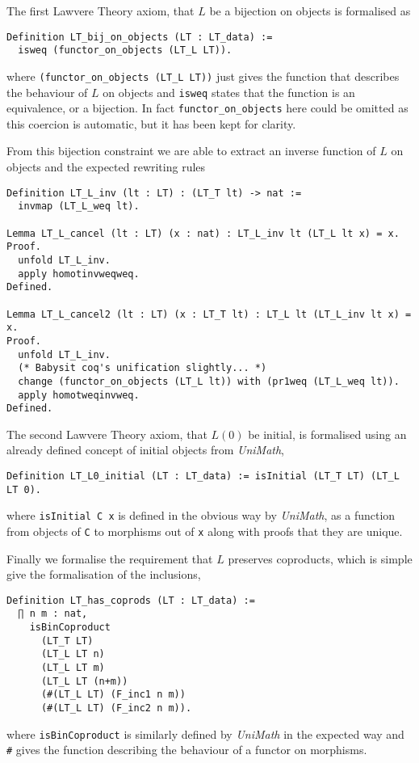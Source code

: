 The first Lawvere Theory axiom, that $L$ be a bijection on objects is formalised
as
\begin{lstlisting}
Definition LT_bij_on_objects (LT : LT_data) := 
  isweq (functor_on_objects (LT_L LT)).
\end{lstlisting}
where \lstinline|(functor_on_objects (LT_L LT))| just gives the function that
describes the behaviour of $L$ on objects and \lstinline|isweq| states that the
function is an equivalence, or a bijection. In fact \lstinline|functor_on_objects|
here could be omitted as this coercion is automatic, but it has been kept for
clarity.

From this bijection constraint we are able to extract an inverse function of $L$
on objects and the expected rewriting rules
\begin{lstlisting}
Definition LT_L_inv (lt : LT) : (LT_T lt) -> nat :=
  invmap (LT_L_weq lt).

Lemma LT_L_cancel (lt : LT) (x : nat) : LT_L_inv lt (LT_L lt x) = x.
Proof.
  unfold LT_L_inv.
  apply homotinvweqweq.
Defined.
  
Lemma LT_L_cancel2 (lt : LT) (x : LT_T lt) : LT_L lt (LT_L_inv lt x) = x.
Proof.
  unfold LT_L_inv.
  (* Babysit coq's unification slightly... *)
  change (functor_on_objects (LT_L lt)) with (pr1weq (LT_L_weq lt)).
  apply homotweqinvweq.
Defined.
\end{lstlisting}

The second Lawvere Theory axiom, that $L(0)$ be initial, is formalised using an
already defined concept of initial objects from \textit{UniMath},
\begin{lstlisting}
Definition LT_L0_initial (LT : LT_data) := isInitial (LT_T LT) (LT_L LT 0).
\end{lstlisting}
where \lstinline|isInitial C x| is defined in the obvious way by \textit{UniMath}, as
a function from objects of \lstinline|C| to morphisms out of \lstinline|x| along with
proofs that they are unique.

Finally we formalise the requirement that $L$ preserves coproducts, which is
simple give the formalisation of the inclusions,
\begin{lstlisting}
Definition LT_has_coprods (LT : LT_data) := 
  ∏ n m : nat, 
    isBinCoproduct 
      (LT_T LT)
      (LT_L LT n)
      (LT_L LT m)
      (LT_L LT (n+m))
      (#(LT_L LT) (F_inc1 n m)) 
      (#(LT_L LT) (F_inc2 n m)).
\end{lstlisting}
where \lstinline|isBinCoproduct| is similarly defined by \textit{UniMath} in the
expected way and \lstinline|#| gives the function describing the behaviour of a
functor on morphisms.

